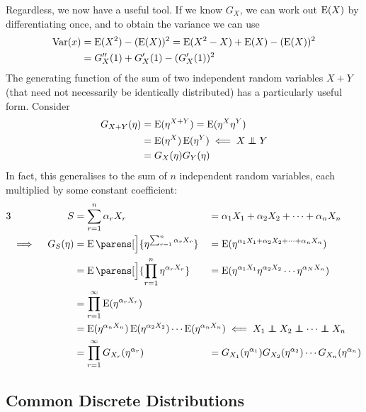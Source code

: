 Regardless, we now have a useful tool. If we know \(G_X\), we can work out
\(\operatorname{E}(X)\) by differentiating once, and to obtain the variance we can use
\begin{align*}
\operatorname{Var}(x) &= \operatorname{E}(X^2) - (\operatorname{E}(X))^2
    = \operatorname{E}(X^2 - X) + \operatorname{E}(X) - (\operatorname{E}(X))^2 \\
    &= G_X''(1) + G_X'(1) - (G_X'(1))^2
\end{align*}
The generating function of the sum of two independent random variables \(X + Y\)
(that need not necessarily be identically distributed) has a particularly useful
form. Consider
\begin{align*}
G_{X+Y}(\eta) &= \Expect(\eta^{X + Y}) = \Expect(\eta^X \eta^Y) \\
    &= \Expect(\eta^X) \Expect(\eta^Y) \impliedby X \independent Y \\
    &= G_X(\eta) G_Y(\eta)
\end{align*}
In fact, this generalises to the sum of \(n\) independent random variables, each
multiplied by some constant coefficient:
\begin{alignat*} 3
    && S &= \sum_{r = 1}^n \alpha_r X_r
    &&= \alpha_1 X_1 + \alpha_2 X_2 + \dotsb + \alpha_n X_n \\
    &\implies{}& G_S(\eta)
        &= \Expect\parens[\Big]{\eta^{\sum_{r = 1}^n \alpha_r X_r}}
    &&= \Expect(\eta^{\alpha_1 X_1 + \alpha_2 X_2 + \dotsb + \alpha_n X_n}) \\
    && &= \Expect\parens[\Big]{\prod_{r = 1}^n \eta^{\alpha_r X_r}}
    &&= \Expect(\eta^{\alpha_1 X_1} \eta^{\alpha_2 X_2} \dotsm
              \eta^{\alpha_N X_n}) \\
&& &= \prod_{r = 1}^\infty\Expect(\eta^{\alpha_r X_r}) \\
&& &= \mathrlap{
        \Expect(\eta^{\alpha_n X_n}) \Expect(\eta^{\alpha_2 X_2}) \dotsm
        \Expect(\eta^{\alpha_n X_n})
            \impliedby X_1 \independent X_2 \independent
                             \dotsb \independent X_n} \\
&& &= \prod_{r = 1}^\infty G_{X_r}(\eta^{\alpha_r})
    &&= G_{X_1}(\eta^{\alpha_1}) G_{X_2}(\eta^{\alpha_2}) \dotsm
        G_{X_n}(\eta^{\alpha_n})
\end{alignat*}

\subsection{Common Discrete Distributions}

